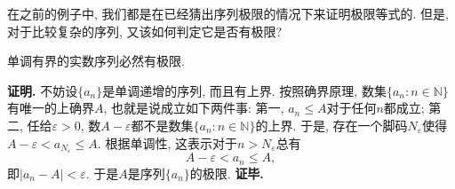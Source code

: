 

在之前的例子中, 我们都是在已经猜出序列极限的情况下来证明极限等式的. 但是, 对于比较复杂的序列, 又该如何判定它是否有极限?

\begin{theorem}{}
单调有界的实数序列必然有极限.
\end{theorem}
\textbf{证明.} 不妨设$\{a_n\}$是单调递增的序列, 而且有上界. 按照确界原理, 数集$\{a_n:n\in\mathbb{N}\}$有唯一的上确界$A$, 也就是说成立如下两件事: 第一, $a_n\leq A$对于任何$n$都成立; 第二, 任给$\varepsilon>0$, 数$A-\varepsilon$都不是数集$\{a_n:n\in\mathbb{N}\}$的上界. 于是, 存在一个脚码$N_\varepsilon$使得$A-\varepsilon<a_{N_\varepsilon}\leq A$. 根据单调性, 这表示对于$n>N_\varepsilon$总有
\[A-\varepsilon<a_n\leq A,\]
即$|a_n-A|<\varepsilon$. 于是$A$是序列$\{a_n\}$的极限. \textbf{证毕.}


